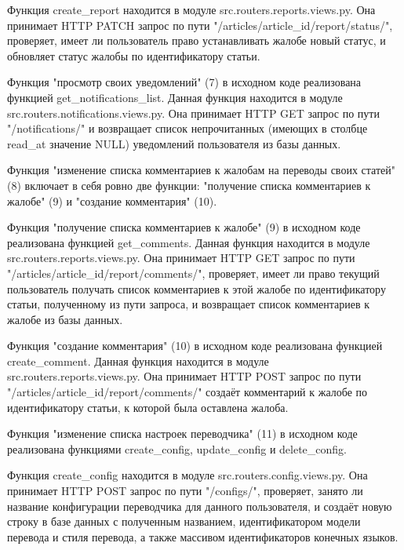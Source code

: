 Функция create\_report находится в модуле src.routers.reports.views.py. Она принимает HTTP PATCH запрос по пути "/articles/{article\_id}/report/status/", проверяет, имеет ли пользователь право устанавливать жалобе новый статус, и обновляет статус жалобы по идентификатору статьи.


Функция "просмотр своих уведомлений" (7) в исходном коде реализована функцией get\_notifications\_list. Данная функция находится в модуле src.routers.notifications.views.py. Она принимает HTTP GET запрос по пути "/notifications/" и возвращает список непрочитанных (имеющих в столбце read\_at значение NULL) уведомлений пользователя из базы данных.


Функция "изменение списка комментариев к жалобам на переводы своих статей" (8) включает в себя ровно две функции: "получение списка комментариев к жалобе" (9) и "создание комментария" (10).

Функция "получение списка комментариев к жалобе" (9) в исходном коде реализована функцией get\_comments. Данная функция находится в модуле src.routers.reports.views.py. Она принимает HTTP GET запрос по пути "/articles/{article\_id}/report/comments/", проверяет, имеет ли право текущий пользователь получать список комментариев к этой жалобе по идентификатору статьи, полученному из пути запроса, и возвращает список комментариев к жалобе из базы данных.

Функция "создание комментария" (10) в исходном коде реализована функцией create\_comment. Данная функция находится в модуле src.routers.reports.views.py. Она принимает HTTP POST запрос по пути "/articles/{article\_id}/report/comments/" создаёт комментарий к жалобе по идентификатору статьи, к которой была оставлена жалоба.


Функция "изменение списка настроек переводчика" (11) в исходном коде реализована функциями create\_config, update\_config и delete\_config.

Функция create\_config находится в модуле src.routers.config.views.py. Она принимает HTTP POST запрос по пути "/configs/", проверяет, занято ли название конфигурации переводчика для данного пользователя, и создаёт новую строку в базе данных с полученным названием, идентификатором модели перевода и стиля перевода, а также массивом идентификаторов конечных языков.

